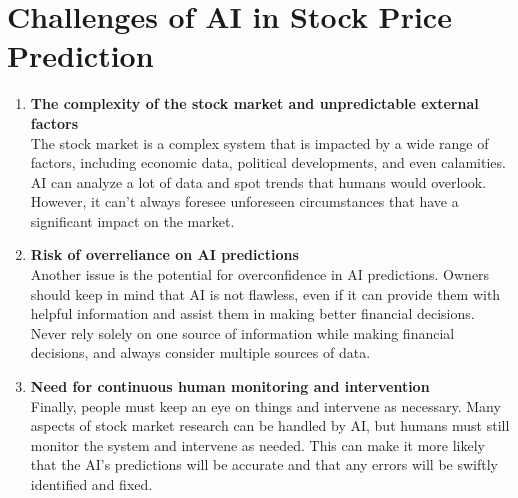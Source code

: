 \section{Challenges of AI in Stock Price Prediction}
\begin{enumerate}
    \item \textbf{The complexity of the stock market and unpredictable external factors}\\ The stock market is a complex system that is impacted by a wide range of factors, including economic data,
political developments, and even calamities. AI can analyze a lot of data and spot trends that humans would
overlook. However, it can't always foresee unforeseen circumstances that have a significant impact on the
market.
    \item \textbf{Risk of overreliance on AI predictions}\\
    Another issue is the potential for overconfidence in AI predictions. Owners should keep in mind that AI is
not flawless, even if it can provide them with helpful information and assist them in making better financial
decisions. Never rely solely on one source of information while making financial decisions, and always
consider multiple sources of data.
\item \textbf{Need for continuous human monitoring and intervention}
\\
Finally, people must keep an eye on things and intervene as necessary. Many aspects of stock market
research can be handled by AI, but humans must still monitor the system and intervene as needed. This can
make it more likely that the AI's predictions will be accurate and that any errors will be swiftly identified
and fixed.
\end{enumerate}
    